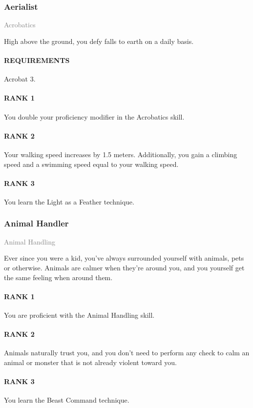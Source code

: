 \subsubsection{Aerialist} \label{tal::aerialist}
\small{\textcolor{gray}{Acrobatics}}

\normalsize
High above the ground, you defy falls to earth on a daily basis.
\paragraph{REQUIREMENTS} Acrobat 3.
\paragraph{RANK 1} You double your proficiency modifier in the Acrobatics skill.
\paragraph{RANK 2} Your walking speed increases by 1.5 meters.
Additionally, you gain a climbing speed and a swimming speed equal to your walking speed.
\paragraph{RANK 3} You learn the Light as a Feather technique.

\subsubsection{Animal Handler} \label{tal::animalhandler}
\small{\textcolor{gray}{Animal Handling}}

\normalsize
Ever since you were a kid, you've always surrounded yourself with animals, pets or otherwise.
Animals are calmer when they're around you, and you yourself get the same feeling when around them.
\paragraph{RANK 1} You are proficient with the Animal Handling skill.
\paragraph{RANK 2} Animals naturally trust you, and you don't need to perform any check to calm an animal or monster that is not already violent toward you.
\paragraph{RANK 3} You learn the Beast Command technique.

